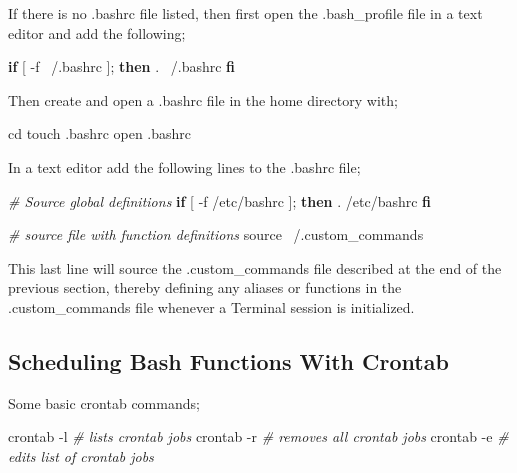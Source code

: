 \documentclass[]{article}
\newenvironment{Shaded}{\begin{snugshade}}{\end{snugshade}}
\newcommand{\KeywordTok}[1]{\textcolor[rgb]{0.13,0.29,0.53}{\textbf{#1}}}
\newcommand{\CommentTok}[1]{\textcolor[rgb]{0.56,0.35,0.01}{\textit{#1}}}
\newcommand{\OtherTok}[1]{\textcolor[rgb]{0.56,0.35,0.01}{#1}}
\newcommand{\FunctionTok}[1]{\textcolor[rgb]{0.00,0.00,0.00}{#1}}
\newcommand{\BuiltInTok}[1]{#1}
\newcommand{\ExtensionTok}[1]{#1}
\newcommand{\NormalTok}[1]{#1}
\begin{document}
If there is no .bashrc file listed, then first open the .bash\_profile
file in a text editor and add the following;

\begin{Shaded}
\begin{Highlighting}[]
\KeywordTok{if}\BuiltInTok{ [} \OtherTok{-f}\NormalTok{ ~/.bashrc}\BuiltInTok{ ]}\NormalTok{; }\KeywordTok{then}
    \BuiltInTok{.} \ExtensionTok{~/.bashrc}
\KeywordTok{fi}
\end{Highlighting}
\end{Shaded}

Then create and open a .bashrc file in the home directory with;

\begin{Shaded}
\begin{Highlighting}[]
\BuiltInTok{cd}
\FunctionTok{touch}\NormalTok{ .bashrc}
\ExtensionTok{open}\NormalTok{ .bashrc}
\end{Highlighting}
\end{Shaded}

In a text editor add the following lines to the .bashrc file;

\begin{Shaded}
\begin{Highlighting}[]
\CommentTok{# Source global definitions}
\KeywordTok{if}\BuiltInTok{ [} \OtherTok{-f}\NormalTok{ /etc/bashrc}\BuiltInTok{ ]}\NormalTok{; }\KeywordTok{then}
    \BuiltInTok{.} \ExtensionTok{/etc/bashrc}
\KeywordTok{fi}

\CommentTok{# source file with function definitions}
\BuiltInTok{source}\NormalTok{ ~/.custom_commands}
\end{Highlighting}
\end{Shaded}

This last line will source the .custom\_commands file described at the
end of the previous section, thereby defining any aliases or functions
in the .custom\_commands file whenever a Terminal session is
initialized.

\subsection{Scheduling Bash Functions With Crontab}

Some basic crontab commands;

\begin{Shaded}
\begin{Highlighting}[]
\ExtensionTok{crontab}\NormalTok{ -l }\CommentTok{# lists crontab jobs}
\ExtensionTok{crontab}\NormalTok{ -r }\CommentTok{# removes all crontab jobs}
\ExtensionTok{crontab}\NormalTok{ -e }\CommentTok{# edits list of crontab jobs}
\end{Highlighting}
\end{Shaded}
\end{document}
